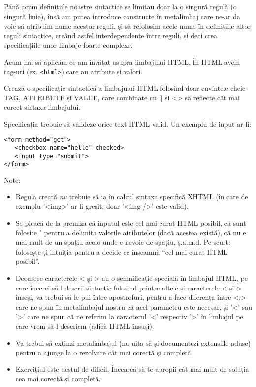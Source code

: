 Până acum definițiile noastre sintactice se limitau doar la
o singură regulă (o singură linie), însă am putea introduce
constructe în metalimbaj care ne-ar da voie să atribuim nume
acestor reguli, și să refolosim acele nume în definițiile altor
reguli sintactice, creând astfel interdependențe între reguli,
și deci crea specificațiile unor limbaje foarte complexe.


\begin{Exercise}[title={Sintaxa HTML},label={ex:sintaxa_html},difficulty=3]
Acum hai să aplicăm ce am învățat asupra limbajului HTML. În HTML avem
tag-uri (ex. \texttt{<html>}) care au atribute și valori.

\Question Crează o specificație sintactică a limbajului HTML folosind
doar cuvintele cheie TAG, ATTRIBUTE și VALUE, care combinate
cu [] și <> să reflecte cât mai corect sintaxa limbajului.

Specificația trebuie să valideze orice text HTML valid.
Un exemplu de input ar fi:
\begin{verbatim}
<form method="get">
   <checkbox name="hello" checked>
   <input type="submit">
</form>
\end{verbatim}
\ExeText
Note:
\begin{itemize}
\item Regula creată \textit{nu} trebuie să ia în calcul sintaxa
specifică XHTML (în care de exemplu '<img>' ar fi greșit, doar '<img />' este valid).
\item Se pleacă de la premiza că inputul este cel mai curat HTML posibil, că
sunt folosite " pentru a delimita valorile atributelor (dacă acestea există), că
nu e mai mult de un spațiu acolo unde e nevoie de spațiu, ș.a.m.d. Pe scurt:
folosește-ți intuiția pentru a decide ce înseamnă ``cel mai curat HTML posibil''.
\item Deoarece caracterele < și > au o semnificație specială în limbajul HTML, pe
care încerci să-l descrii sintactic folosind printre altele
și caracterele < și > înseși, va trebui să le pui între apostrofuri, pentru a face
diferența între <,> care ne spun în metalimbajul nostru
că acel parametru este necesar, și '<' sau '>' care
ne spun că ne referim la caracterul '<' respectiv '>' în limbajul pe care
vrem să-l descriem (adică HTML însuși).
\item Va trebui să extinzi metalimbajul (nu uita să și documentezi extensiile aduse)
pentru a ajunge la o rezolvare cât mai corectă și completă
\item Exercițiul este destul de dificil. Încearcă să te apropii cât mai mult de soluția
cea mai corectă și completă.
\end{itemize}
\end{Exercise}
